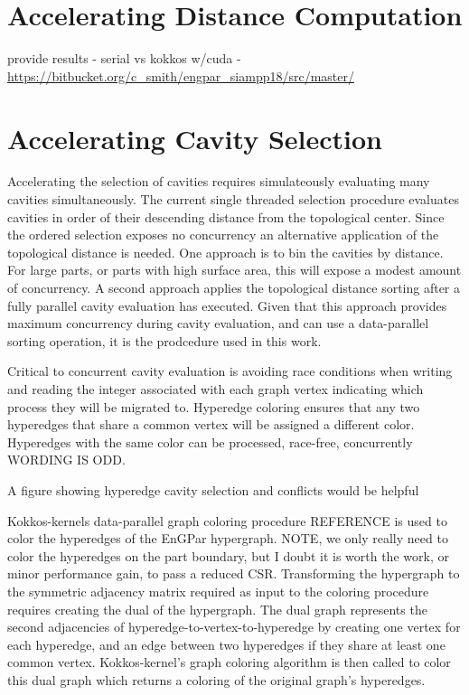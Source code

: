 \documentclass[graybox]{svmult}
\begin{document}
\section{Accelerating Distance Computation} \label{sec:dist}

provide results - serial vs kokkos w/cuda -
\url{https://bitbucket.org/c_smith/engpar_siampp18/src/master/}

\section{Accelerating Cavity Selection} \label{sec:select}

Accelerating the selection of cavities requires simulateously evaluating many
cavities simultaneously.
The current single threaded selection procedure evaluates cavities in order of
their descending distance from the topological center.
Since the ordered selection exposes no concurrency an alternative application of
the topological distance is needed.
One approach is to bin the cavities by distance.
For large parts, or parts with high surface area, this will expose a modest
amount of concurrency.
A second approach applies the topological distance sorting after a fully
parallel cavity evaluation has executed.
Given that this approach provides maximum concurrency during cavity evaluation,
and can use a data-parallel sorting operation, it is the prodcedure used in this
work.

Critical to concurrent cavity evaluation is avoiding race conditions when
writing and reading the integer associated with each graph vertex indicating
which process they will be migrated to.
Hyperedge coloring ensures that any two hyperedges that share a common vertex
will be assigned a different color.
Hyperedges with the same color can be processed, race-free, concurrently
{\color{red}WORDING IS ODD}.

{\color{red}A figure showing hyperedge cavity selection and conflicts would be
helpful}

Kokkos-kernels data-parallel graph coloring procedure REFERENCE is used to
color the hyperedges of the EnGPar hypergraph.
{\color{red}NOTE, we only really need to color the hyperedges on the part boundary,
but I doubt it is worth the work, or minor performance gain, to pass a reduced CSR.}
Transforming the hypergraph to the symmetric adjacency matrix required as input
to the coloring procedure requires creating the dual of the hypergraph.
The dual graph represents the second adjacencies of
hyperedge-to-vertex-to-hyperedge by creating one vertex for each hyperedge, and
an edge between two hyperedges if they share at least one common vertex.
Kokkos-kernel's graph coloring algorithm is then called to color this dual graph
which returns a coloring of the original graph's hyperedges.
\end{document}
